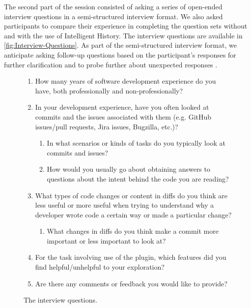 The second part of the session consisted of asking a series of open-ended interview questions 
in a semi-structured interview format.
We also asked participants to compare their experience in completing the question sets without and with the use of Intelligent History.
The interview questions are available in \autoref{fig:Interview-Questions}.
As part of the semi-structured interview format, 
we anticipate asking follow-up questions based on the participant's responses for further clarification 
and to probe further about unexpected responses \cite{shull_guide_2007}. 

\begin{figure}[h]
  \begin{mdframed}
    \begin{enumerate}
      \item How many years of software development experience do you have, both professionally and non-professionally?
      \item In your development experience, have you often looked at commits and the issues associated with them (e.g. GitHub issues/pull requests, Jira issues, Bugzilla, etc.)?
          \begin{enumerate}
              \item In what scenarios or kinds of tasks do you typically look at commits and issues?
              \item How would you usually go about obtaining answers to questions about the intent behind the code you are reading?
          \end{enumerate}
      \item What types of code changes or content in diffs do you think are less useful or more useful when trying to understand why a developer wrote code a certain way or made a particular change? 
          \begin{enumerate}
              \item What changes in diffs do you think make a commit more important or less important to look at?
          \end{enumerate}
      \item For the task involving use of the plugin, which features did you find helpful/unhelpful to your exploration?
      \item Are there any comments or feedback you would like to provide?
    \end{enumerate}
\end{mdframed}
  \caption{The interview questions.}
  \label{fig:Interview-Questions}
\end{figure}

